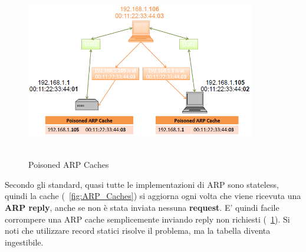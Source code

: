 \begin{figure}[htbp]
	\centering%
	\subfigure%
	{\includegraphics[height=7cm, width=10cm, keepaspectratio]{Immagini/reti/Poisoned_ARP_Caches.png}}
	\caption{Poisoned ARP Caches\label{fig:Poisoned_ARP_Caches}} 	
\end{figure}
Secondo gli standard, quasi tutte le implementazioni di ARP sono stateless, quindi la cache (\figurename~\ref{fig:ARP_Caches}) si aggiorna ogni volta che viene ricevuta una \textbf{ARP reply}, anche se non è stata inviata nessuna \textbf{request}. E' quindi facile corrompere una ARP cache semplicemente inviando reply non richiesti (\figurename~\ref{fig:Poisoned_ARP_Caches}). Si noti che utilizzare record statici risolve il problema, ma la tabella diventa ingestibile.

